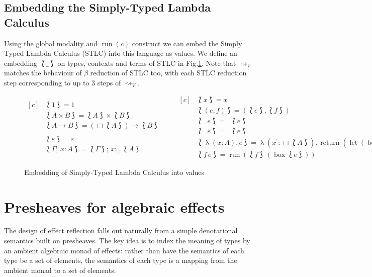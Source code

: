 \documentclass[acmsmall, screen, nonacm]{acmart}
\theoremstyle{definition}
\newcommand{\glob}{\mathop{\Box}}
\newcommand{\fst}{\mathop{\pi_1}}
\newcommand{\snd}{\mathop{\pi_2}}
\newcommand{\abs}[3]{\mathop{\lambda}(#1 \types #2).\,#3}
\newcommand{\app}[2]{#1\,#2}
\newcommand{\types}{\mathrel{:}}
\newcommand{\gtypes}{\mathrel{:_{\Box}}}
\newcommand{\cempty}{\varepsilon}
\newcommand{\ccons}[2]{#1;\,#2}
\newcommand{\lbind}[3]{\ccons{#1}{#2\types#3}}
\newcommand{\gbind}[3]{\ccons{#1}{#2\gtypes#3}}
\newcommand{\return}[1]{\mathop{\mathrm{return}} #1}
\newcommand{\gbox}[1]{\mathop{\mathrm{box}} #1}
\newcommand{\gunbox}[3]{\mathop{\mathrm{let}} (\gbox #1) = #2 \mathop{\mathrm{in}} #3}
\newcommand{\grun}[1]{\mathop{\mathrm{run}}(#1)}
\newcommand{\reducestov}{\rightsquigarrow_V}
\newcommand{\embed}[1]{\mathopen{\lbag}#1\mathclose{\rbag}}
\begin{document}
\subsection{Embedding the Simply-Typed Lambda Calculus}

Using the global modality and $\grun{c}$ construct we can embed the
Simply Typed Lambda Calculus (STLC) into this language as values. We
define an embedding $\embed{\_}$ on types, contexts and terms of STLC in
Fig.\ref{fig:stlc}. Note that $\reducestov$ matches the behaviour of
$\beta$ reduction of STLC too, with each STLC reduction step
corresponding to up to 3 steps of $\reducestov$.
\begin{figure}
\begin{equation*}
\begin{aligned}[c]
  &\embed{1} = 1 \\
  &\embed{A \times B} = \embed{A} \times \embed{B} \\
  &\embed{A \rightarrow B} = (\glob \embed{A}) \rightarrow \embed{B} \\ \\
  &\embed{\cempty} = \cempty \\
  &\embed{\lbind{\Gamma}{x}{A}} = \gbind{\embed{\Gamma}}{x}{\embed{A}}
\end{aligned}
\qquad
\begin{aligned}[c]
  &\embed{x} = x \\
  &\embed{(e, f)} = (\embed{e}, \embed{f}) \\
  &\embed{\fst{e}} = \fst{\embed{e}} \\
  &\embed{\snd{e}} = \snd{\embed{e}} \\
  &\embed{\abs{x}{A}{e}} =
    \abs{x^{\prime}}{\glob \embed{A}}{\return{(\gunbox{x}{x^{\prime}}{\embed{e}})}} \\
  &\embed{\app{f}{e}} = \grun{\app{\embed{f}}{(\gbox{\embed{e}})}}
\end{aligned}
\end{equation*}
\caption{Embedding of Simply-Typed Lambda Calculus into values}
\label{fig:stlc}
\end{figure}

\section{Presheaves for algebraic effects}
\label{sec:semantics}

The design of effect reflection falls out naturally from a simple
denotational semantics built on presheaves. The key idea is to index the
meaning of types by an ambient algebraic monad of effects: rather than
have the semantics of each type be a set of elements, the semantics of
each type is a mapping from the ambient monad to a set of elements.
\end{document}
